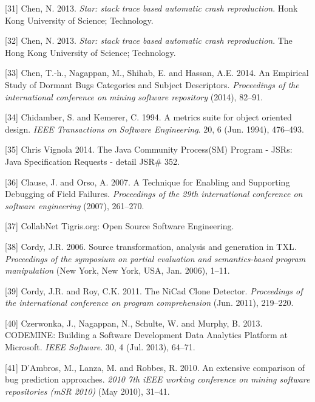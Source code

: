 \documentclass[12pt]{report}
\begin{document}
\hypertarget{ref-Chen2013a}{}
{[}31{]} Chen, N. 2013. \emph{Star: stack trace based automatic crash
reproduction}. Honk Kong University of Science; Technology.

\hypertarget{ref-Chen2013}{}
{[}32{]} Chen, N. 2013. \emph{Star: stack trace based automatic crash
reproduction}. The Hong Kong University of Science; Technology.

\hypertarget{ref-Chen2014}{}
{[}33{]} Chen, T.-h., Nagappan, M., Shihab, E. and Hassan, A.E. 2014. An
Empirical Study of Dormant Bugs Categories and Subject Descriptors.
\emph{Proceedings of the international conference on mining software
repository} (2014), 82--91.

\hypertarget{ref-Chidamber1994}{}
{[}34{]} Chidamber, S. and Kemerer, C. 1994. A metrics suite for object
oriented design. \emph{IEEE Transactions on Software Engineering}. 20, 6
(Jun. 1994), 476--493.

\hypertarget{ref-ChrisVignola2014}{}
{[}35{]} Chris Vignola 2014. The Java Community Process(SM) Program -
JSRs: Java Specification Requests - detail JSR\# 352.

\hypertarget{ref-Clause2007}{}
{[}36{]} Clause, J. and Orso, A. 2007. A Technique for Enabling and
Supporting Debugging of Field Failures. \emph{Proceedings of the 29th
international conference on software engineering} (2007), 261--270.

\hypertarget{ref-CollabNet}{}
{[}37{]} CollabNet Tigris.org: Open Source Software Engineering.

\hypertarget{ref-Cordy2006a}{}
{[}38{]} Cordy, J.R. 2006. Source transformation, analysis and
generation in TXL. \emph{Proceedings of the symposium on partial
evaluation and semantics-based program manipulation} (New York, New
York, USA, Jan. 2006), 1--11.

\hypertarget{ref-Cordy2011}{}
{[}39{]} Cordy, J.R. and Roy, C.K. 2011. The NiCad Clone Detector.
\emph{Proceedings of the international conference on program
comprehension} (Jun. 2011), 219--220.

\hypertarget{ref-Czerwonka2013}{}
{[}40{]} Czerwonka, J., Nagappan, N., Schulte, W. and Murphy, B. 2013.
CODEMINE: Building a Software Development Data Analytics Platform at
Microsoft. \emph{IEEE Software}. 30, 4 (Jul. 2013), 64--71.

\hypertarget{ref-DAmbros2010}{}
{[}41{]} D'Ambros, M., Lanza, M. and Robbes, R. 2010. An extensive
comparison of bug prediction approaches. \emph{2010 7th iEEE working
conference on mining software repositories (mSR 2010)} (May 2010),
31--41.
\end{document}
